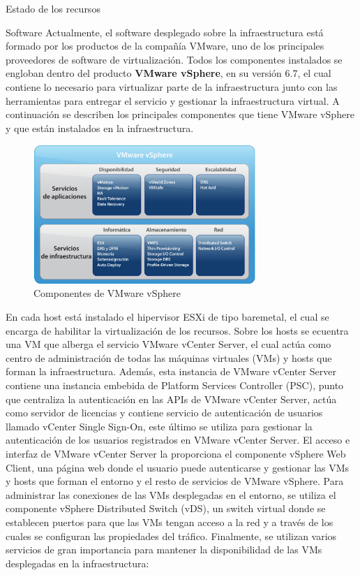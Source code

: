 \begin{chapter}{Estado de los recursos}
\begin{section}{Software}
    \label{subsec:softwareinstalado}
    Actualmente, el software desplegado sobre la infraestructura está formado por los productos de la compañía VMware, uno de los principales proveedores de software de virtualización. Todos los componentes instalados se engloban dentro del producto \textbf{VMware vSphere}, en su versión 6.7, el cual contiene lo necesario para virtualizar parte de la infraestructura junto con las herramientas para entregar el servicio y gestionar la infraestructura virtual. A continuación	se describen los principales componentes que tiene VMware vSphere y que están instalados en la infraestructura.
    \begin{figure}[h]
        \centering
        \includegraphics[width=0.75\textwidth]{imaxes/cap2recursos/contentVSphere}
        \caption{Componentes de VMware vSphere\cite{fotovSphere}}
        \label{fig:vSphere-components}
    \end{figure}
    \FloatBarrier
    En cada host está instalado el hipervisor ESXi de tipo baremetal, el cual se encarga de habilitar la virtualización de los recursos. Sobre los hosts se ecuentra una VM que alberga el servicio VMware vCenter Server, el cual actúa como centro de administración de todas las máquinas virtuales (VMs) y hosts que forman la infraestructura. Además, esta instancia de VMware vCenter Server contiene una instancia embebida de Platform Services Controller (PSC), punto que centraliza la autenticación en las APIs de VMware vCenter Server, actúa como servidor de licencias y contiene servicio de autenticación de usuarios llamado vCenter Single Sign-On, este último se utiliza para gestionar la autenticación de los usuarios registrados en VMware vCenter Server. El acceso e interfaz de VMware vCenter Server la proporciona el componente vSphere Web Client, una página web donde el usuario puede autenticarse y gestionar las VMs y hosts que forman el entorno y el resto de servicios de VMware vSphere. Para administrar las conexiones de las VMs desplegadas en el entorno, se utiliza el componente vSphere Distributed Switch (vDS), un switch virtual donde se establecen puertos para que las VMs tengan acceso a la red y a través de los cuales se configuran las propiedades del tráfico. Finalmente, se utilizan varios servicios de gran importancia para mantener la disponibilidad de las VMs desplegadas en la infraestructura:

\end{section}
\end{chapter}
